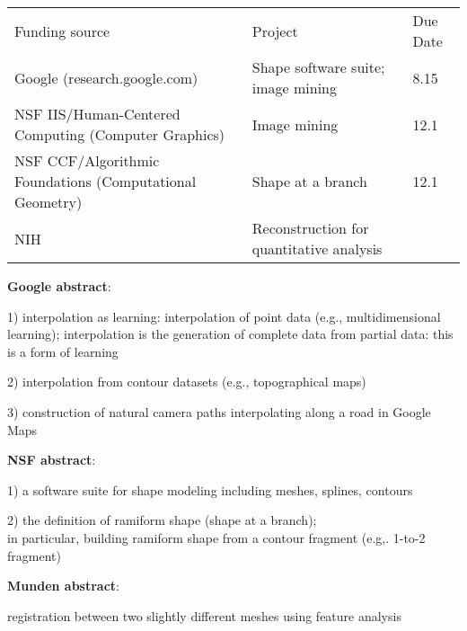 \documentclass[10pt]{article}
\begin{document}
\begin{tabular}{lll} \hline
Funding source & Project & Due Date \\
Google (research.google.com) & Shape software suite; image mining & 8.15 \\
NSF IIS/Human-Centered Computing (Computer Graphics) & Image mining & 12.1\\
NSF CCF/Algorithmic Foundations (Computational Geometry) & Shape at a branch & 12.1\\
NIH & Reconstruction for quantitative analysis \\ \hline
\end{tabular}

\clearpage

{\bf Google abstract}:

1) interpolation as learning:
interpolation of point data (e.g., multidimensional learning);
interpolation is the generation of complete data from partial data: 
this is a form of learning

2) interpolation from contour datasets (e.g., topographical maps)

3) construction of natural camera paths interpolating along a road in Google Maps

{\bf NSF abstract}:

1) a software suite for shape modeling including meshes, splines, contours

2) the definition of ramiform shape (shape at a branch);\\
in particular, building ramiform shape from a contour fragment (e.g,. 1-to-2 fragment)

{\bf Munden abstract}:

registration between two slightly different meshes using feature analysis
\end{document}

